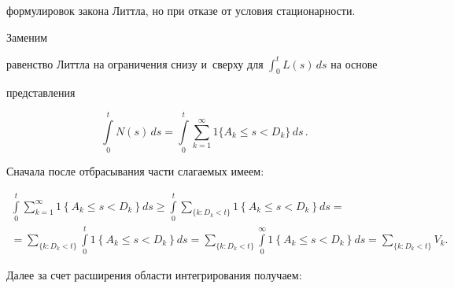формулировок закона Литтла, но при отказе от условия ста\-ци\-о\-нар\-ности. 





Заменим 


равенство Литтла на ограничения снизу и~сверху для $\int_0^t L(s)\,ds$ на основе 


представления





\vspace*{2pt}





\noindent


     $$


     \int\limits_0^t N(s)\,ds =\int\limits_0^t \sum\limits_{k=1}^\infty 1\{ A_k\leq 


s<D_k\}\,ds\,.


     $$




     Сначала после отбрасывания час\-ти сла\-га\-емых имеем:


     


     \vspace*{-6pt}


     


     \noindent


     \begin{multline*}


     \int\limits_0^t \sum\limits^\infty_{k=1} 1\left\{ A_k\leq s<D_k\right\}ds \geq 


     \int\limits_0^t \sum\limits_{\{k:D_k<t\}} 1\left\{ A_k\leq s<D_k\right\}ds={}\\


     {}= 


     \!\!\!\sum\limits_{\{ k:D_k<t\}} \int\limits_0^t 1\left\{ A_k\leq s<D_k\right\}ds= 


\!\!\!\sum\limits_{\{k: D_k<t\}} \int\limits_0^\infty 1\left\{ A_k\leq s< 


D_k\right\}ds=\!\!\!\sum\limits_{\{k: D_k<t\}}\!\!\!\! V_k.


     \end{multline*}




     Далее за счет расширения об\-ласти интегрирования получаем:


